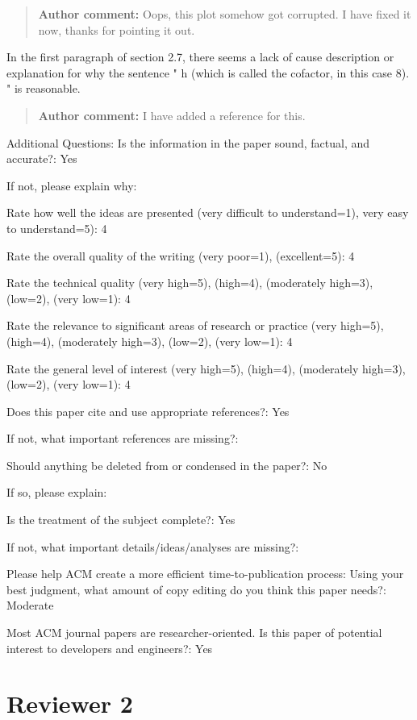 \documentclass[10pt]{article}
\newcommand{\authorcomment}[1]{\begin{quote}\textbf{Author comment:} #1\end{quote}}
\begin{document}
\authorcomment{Oops, this plot somehow got corrupted. I have fixed it now, thanks for pointing it out.}
\begin{spverbatim}
In the first paragraph of section 2.7, there seems a lack of cause description or explanation for why the sentence " h (which is called the cofactor, in this case 8). " is reasonable.
\end{spverbatim}
\authorcomment{I have added a reference for this.}
\begin{spverbatim}
Additional Questions:
Is the information in the paper sound, factual, and accurate?: Yes

If not, please explain why: 

Rate how well the ideas are presented (very difficult to understand=1), very easy to understand=5): 4

Rate the overall quality of the writing (very poor=1), (excellent=5): 4

Rate the technical quality (very high=5), (high=4), (moderately high=3), (low=2), (very low=1): 4

Rate the relevance to significant areas of research or practice (very high=5), (high=4), (moderately high=3), (low=2), (very low=1): 4

Rate the general level of interest (very high=5), (high=4), (moderately high=3), (low=2), (very low=1): 4

Does this paper cite and use appropriate references?: Yes

If not, what important references are missing?: 

Should anything be deleted from or condensed in the paper?: No

If so, please explain: 

Is the treatment of the subject complete?: Yes

If not, what important details/ideas/analyses are missing?: 

Please help ACM create a more efficient time-to-publication process: Using your best judgment, what amount of copy editing do you think this paper needs?: Moderate

Most ACM journal papers are researcher-oriented. Is this paper of potential interest to developers and engineers?: Yes
\end{spverbatim}


\section{Reviewer 2}
\end{document}
